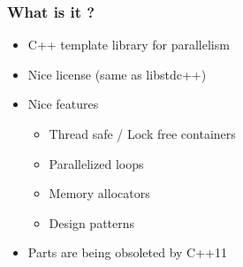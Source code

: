 \begin{frame}
  \frametitle{What is it ?}

  \begin{itemize}
  \item C++ template library for parallelism
  \item Nice license (same as libstdc++)
  \item Nice features
    \begin{itemize}
    \item Thread safe / Lock free containers
    \item Parallelized loops
    \item Memory allocators
    \item Design patterns
    \end{itemize}
  \item Parts are being obsoleted by C++11
  \end{itemize}
\end{frame}
